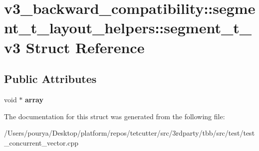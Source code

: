 \hypertarget{structv3__backward__compatibility_1_1segment__t__layout__helpers_1_1segment__t__v3}{}\section{v3\+\_\+backward\+\_\+compatibility\+:\+:segment\+\_\+t\+\_\+layout\+\_\+helpers\+:\+:segment\+\_\+t\+\_\+v3 Struct Reference}
\label{structv3__backward__compatibility_1_1segment__t__layout__helpers_1_1segment__t__v3}
\subsection*{Public Attributes}
\begin{DoxyCompactItemize}
\item 
\hypertarget{structv3__backward__compatibility_1_1segment__t__layout__helpers_1_1segment__t__v3_ad4e735ffe31ee2a9e7acae3d3d742e13}{}void $\ast$ {\bfseries array}\label{structv3__backward__compatibility_1_1segment__t__layout__helpers_1_1segment__t__v3_ad4e735ffe31ee2a9e7acae3d3d742e13}

\end{DoxyCompactItemize}


The documentation for this struct was generated from the following file\+:\begin{DoxyCompactItemize}
\item 
/\+Users/pourya/\+Desktop/platform/repos/tetcutter/src/3rdparty/tbb/src/test/test\+\_\+concurrent\+\_\+vector.\+cpp\end{DoxyCompactItemize}
